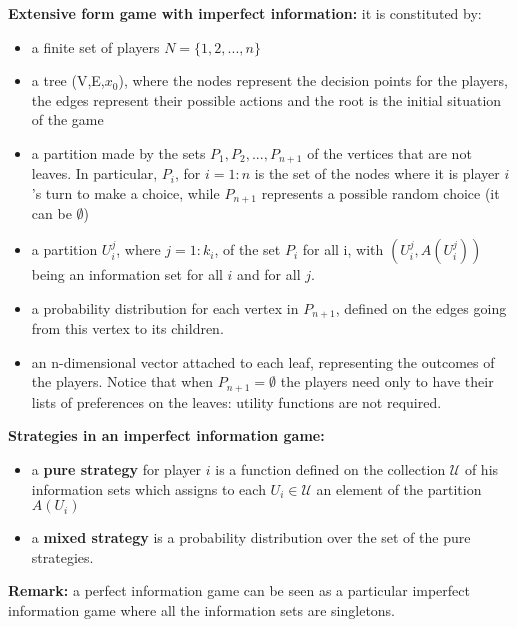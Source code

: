 \bigskip
\noindent \textbf{Extensive form game with imperfect information:} it is 
constituted by:
\begin{itemize}
	\item a finite set of players $N = \{1,2,...,n\}$
	\item a tree (V,E,$x_0$), where the nodes represent the decision points for 
	the players, the edges represent their possible actions and the root is the 
	initial situation of the game
	\item a partition made by the sets $P_1,P_2,...,P_{n+1}$ of the vertices 
	that are not leaves. In particular, $P_i$, for $i=1:n$ is the set of the 
	nodes where it is player $i$'s turn to make a choice, while $P_{n+1}$ 
	represents a possible random choice (it can be $\emptyset$)
	\item a partition $U_i^j$, where $j=1:k_i$, of the set $P_i$ for all i, 
	with $(U_i^j,A(U_i^j))$ being an information set for all $i$ and for all $j$.
	\item a probability distribution for each vertex in $P_{n+1}$, defined on 
	the edges going from this vertex to its children.
	\item an n-dimensional vector attached to each leaf, representing the 
	outcomes of the players. Notice that when $P_{n+1}=\emptyset$ the players 
	need only to have their lists of preferences on the leaves: utility 
	functions are not required.
\end{itemize}

\bigskip
\noindent \textbf{Strategies in an imperfect information game:}
\begin{itemize}
	\item a \textbf{pure strategy} for player $i$ is a function defined on the 
	collection $\mathcal{U}$ of his information sets which assigns to each 
	$U_i \in \mathcal{U}$ an element of the partition $A(U_i)$
	\item a \textbf{mixed strategy} is a probability distribution over the set 
	of the pure strategies.
\end{itemize}

\bigskip
\noindent \textbf{Remark:} a perfect information game can be seen as a 
particular imperfect information game where all the information sets are 
singletons.

%